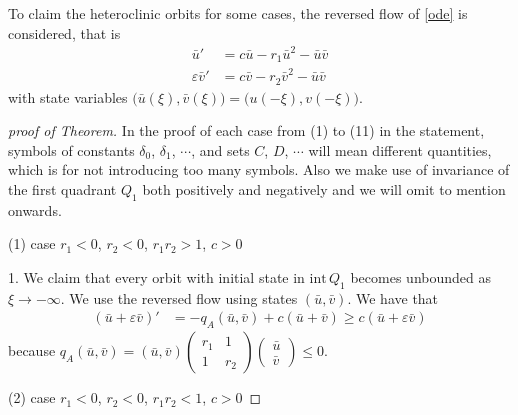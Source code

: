 \documentclass{amsart}
\theoremstyle{definition}
\numberwithin{equation}{section}
\def\ii{{\textrm{int}}\,}
\begin{document}
To claim the heteroclinic orbits for some cases, the reversed flow of \eqref{ode} is considered, that is
\begin{equation}\label{barode}
\begin{aligned}
 \bar{u}' &=c\bar{u} - r_{1}\bar{u}^{2} - \bar {u} \bar{v}\\
 \varepsilon \bar{v}' &=c\bar{v} - r_{2}\bar{v}^{2} - \bar{u} \bar{v}
\end{aligned}
\end{equation} 
with state variables $\big(\bar u(\xi), \bar v(\xi)\big) = \big(u(-\xi),v(-\xi)\big)$. 



\begin{proof}[proof of Theorem] In the proof of each case from (1) to (11) in the statement, symbols of constants $\delta_0$, $\delta_1$, $\cdots$, and sets $C$, $D$, $\cdots$ will mean different quantities, which is for not introducing too many symbols. Also we make use of invariance of the first quadrant $Q_1$ both positively and negatively and we will omit to mention onwards. 

\bigskip\bigskip

(1) case $r_1<0$, $r_2<0$, $r_1r_2>1$, $c>0$ 

1. We claim that every orbit with initial state in $\ii Q_1$ becomes unbounded as $\xi \rightarrow -\infty.$ We use the reversed flow using states $(\bar u, \bar v)$. We have that
\begin{align*}
  (\bar u+\varepsilon\bar v)' &= - q_A(\bar u ,\bar v) + c(\bar u+\bar v) \ge c(\bar u+\varepsilon\bar v) 
 \end{align*}
because $q_A(\bar u, \bar v) = (\bar u, \bar v) \begin{pmatrix} r_1 & 1 \\ 1 & r_2 \end{pmatrix}\begin{pmatrix} \bar u \\ \bar v \end{pmatrix} \le 0$.
\bigskip\bigskip

(2) case  $r_1<0$, $r_2<0$, $r_1r_2<1$, $c>0$



\end{proof}
\end{document}
